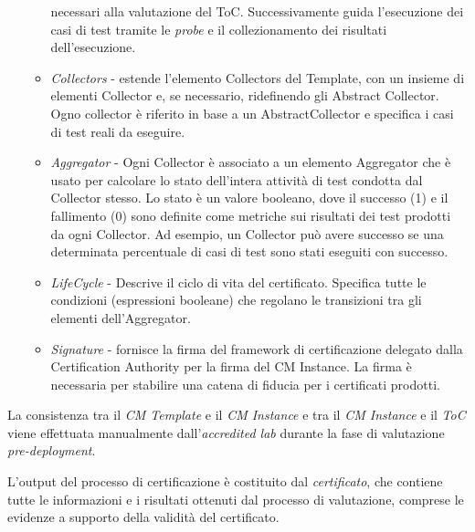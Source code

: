 \documentclass[../main.tex]{subfiles}
\begin{document}
\begin{itemize}
\begin{itemize}
necessari alla valutazione del ToC.
Successivamente guida l'esecuzione dei casi di test tramite le \textit{probe} e il collezionamento dei risultati dell'esecuzione.
\item \textit{Collectors} - estende l'elemento Collectors del Template, con un insieme di elementi Collector e, se necessario, ridefinendo gli Abstract Collector.
Ogno collector è riferito in base a un AbstractCollector e specifica i casi di test reali da eseguire.
\item \textit{Aggregator} - Ogni Collector è associato a un elemento Aggregator che è usato per calcolare lo stato dell'intera attività di test condotta dal Collector stesso.
Lo stato è un valore booleano, dove il successo (1) e il fallimento (0) sono definite come metriche sui risultati dei test prodotti da ogni Collector.
Ad esempio, un Collector può avere successo se una determinata percentuale di casi di test sono stati eseguiti con successo.
\item \textit{LifeCycle} - Descrive il ciclo di vita del certificato. Specifica tutte le condizioni (espressioni booleane) che regolano le transizioni tra gli elementi dell'Aggregator.
\item \textit{Signature} - fornisce la firma del framework di certificazione delegato dalla Certification Authority per la firma del CM Instance.
La firma è necessaria per stabilire una catena di fiducia per i certificati prodotti.
\end{itemize}
\end{itemize}

La consistenza tra il \textit{CM Template} e il \textit{CM Instance} e tra il \textit{CM Instance} e il \textit{ToC} viene effettuata manualmente dall'\textit{accredited lab} durante la fase di valutazione  \textit{pre-deployment}.

L'output del processo di certificazione è costituito dal \textit{certificato}, che contiene tutte le informazioni e i risultati ottenuti dal processo di valutazione, comprese le evidenze a supporto della validità del certificato.
\end{document}
